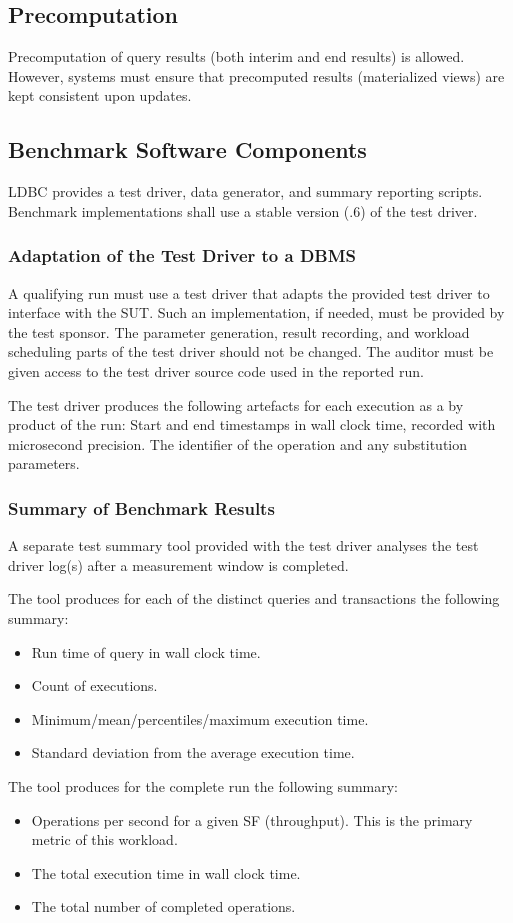 \subsection{Precomputation}

Precomputation of query results (both interim and end results) is allowed. However, systems must ensure that precomputed results (\eg materialized views) are kept consistent upon updates.

\subsection{Benchmark Software Components}
\label{sec:snb-software-components}
LDBC provides a test driver, data generator, and summary reporting scripts. Benchmark implementations shall use a stable version (.6) of the test driver.

\subsubsection{Adaptation of the Test Driver to a DBMS}
\label{sec:test-driver}
A qualifying run must use a test driver that adapts the provided test driver to interface with the SUT. Such an implementation, if needed, must be provided by the test sponsor. The parameter generation, result recording, and workload scheduling parts of the test driver should not be changed. The auditor must be given access to the test driver source code used in the reported run.

The test driver produces the following artefacts for each execution as a by product of the run: Start and end timestamps in wall clock time, recorded with microsecond precision. The identifier of the operation and any substitution parameters.


\subsubsection{Summary of Benchmark Results}
\label{sec:performance-metrics}
A separate test summary tool provided with the test driver analyses the test driver log(s) after a measurement window is completed. 

The tool produces for each of the distinct queries and transactions the following summary:
\begin{itemize}
    \item Run time of query in wall clock time.
    \item Count of executions.
    \item Minimum/mean/percentiles/maximum execution time.
    \item Standard deviation from the average execution time.
\end{itemize}
The tool produces for the complete run the following summary:
\begin{itemize}
    \item Operations per second for a given SF (throughput). This is the primary metric of this workload.
    \item The total execution time in wall clock time.
    \item The total number of completed operations.
\end{itemize}


